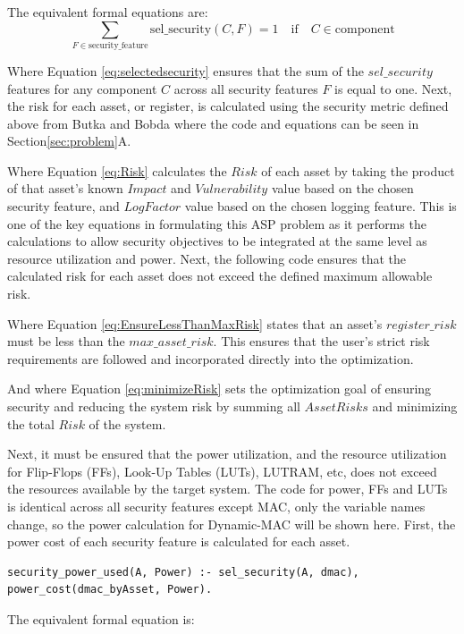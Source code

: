 The equivalent formal equations are:
\begin{equation}
\label{eq:selectedsecurity}
\sum_{F \in \text{security\_feature}} \text{sel\_security}(C, F) = 1 \quad \text{if} \quad C \in \text{component}
\end{equation}


Where Equation \ref{eq:selectedsecurity} ensures that the sum of the \(sel\_security\) features for any component \(C\) across all security features \(F\) is equal to one. Next, the risk for each asset, or register, is calculated using the security metric defined above from Butka and Bobda \cite{butka_measuring_2025} where the code and equations can be seen in Section\ref{sec:problem}A.

Where Equation \ref{eq:Risk} calculates the \(Risk\) of each asset by taking the product of that asset's known \(Impact\) and \(Vulnerability\) value based on the chosen security feature, and \(LogFactor\) value based on the chosen logging feature. This is one of the key equations in formulating this ASP problem as it performs the calculations to allow security objectives to be integrated at the same level as resource utilization and power. Next, the following code ensures that the calculated risk for each asset does not exceed the defined maximum allowable risk.

Where Equation \ref{eq:EnsureLessThanMaxRisk} states that an asset's \(register\_risk\) must be less than the \(max\_asset\_risk\). This ensures that the user's strict risk requirements are followed and incorporated directly into the optimization.


And where Equation \ref{eq:minimizeRisk} sets the optimization goal of ensuring security and reducing the system risk by summing all \(Asset Risks\) and minimizing the total \(Risk\) of the system. 

Next, it must be ensured that the power utilization, and the resource utilization for Flip-Flops (FFs), Look-Up Tables (LUTs), LUTRAM, etc, does not exceed the resources available by the target system. The code for power, FFs and LUTs is identical across all security features except MAC, only the variable names change, so the power calculation for Dynamic-MAC will be shown here. First, the power cost of each security feature is calculated for each asset.

\begin{verbatim}
security_power_used(A, Power) :- sel_security(A, dmac), power_cost(dmac_byAsset, Power).
\end{verbatim}
The equivalent formal equation is:


